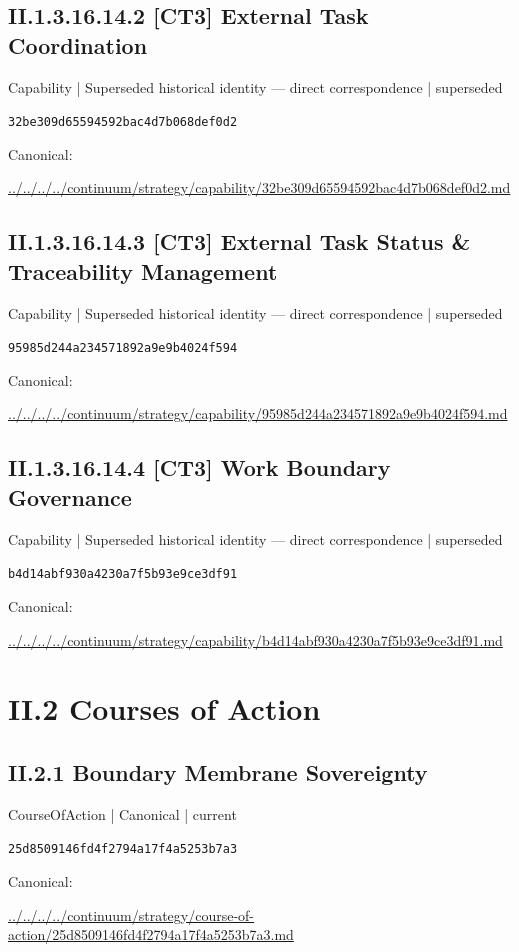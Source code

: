 \documentclass[10pt,a4paper]{article}
\begin{document}
\subsection*{II.1.3.16.14.2 [CT3] External Task Coordination}
{\small Capability | Superseded historical identity — direct correspondence | superseded}\par
\texttt{32be309d65594592bac4d7b068def0d2}\par
Canonical: \par
{\footnotesize\url{../../../../continuum/strategy/capability/32be309d65594592bac4d7b068def0d2.md}}\par
\subsection*{II.1.3.16.14.3 [CT3] External Task Status \& Traceability Management}
{\small Capability | Superseded historical identity — direct correspondence | superseded}\par
\texttt{95985d244a234571892a9e9b4024f594}\par
Canonical: \par
{\footnotesize\url{../../../../continuum/strategy/capability/95985d244a234571892a9e9b4024f594.md}}\par
\subsection*{II.1.3.16.14.4 [CT3] Work Boundary Governance}
{\small Capability | Superseded historical identity — direct correspondence | superseded}\par
\texttt{b4d14abf930a4230a7f5b93e9ce3df91}\par
Canonical: \par
{\footnotesize\url{../../../../continuum/strategy/capability/b4d14abf930a4230a7f5b93e9ce3df91.md}}\par
\section*{II.2 Courses of Action}
\subsection*{II.2.1 Boundary Membrane Sovereignty}
{\small CourseOfAction | Canonical | current}\par
\texttt{25d8509146fd4f2794a17f4a5253b7a3}\par
Canonical: \par
{\footnotesize\url{../../../../continuum/strategy/course-of-action/25d8509146fd4f2794a17f4a5253b7a3.md}}\par
\end{document}
